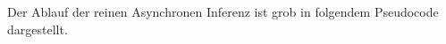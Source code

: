 Der Ablauf der reinen Asynchronen Inferenz ist grob in 
folgendem Pseudocode dargestellt. 





        



        











